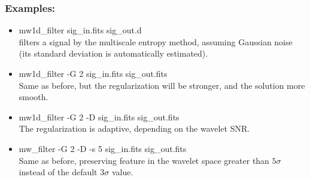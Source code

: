 \subsubsection*{Examples:}
\begin{itemize}
\baselineskip=0.4truecm
\itemsep=0.1truecm
\item mw1d\_filter sig\_in.fits sig\_out.d \\
filters a signal by the multiscale entropy method, assuming
Gaussian noise (its standard deviation is automatically estimated).
\item mw1d\_filter -G 2 sig\_in.fits sig\_out.fits \\
Same as before, but the regularization will be stronger, and the solution
more smooth.  
\item mw1d\_filter -G 2 -D sig\_in.fits sig\_out.fits \\
The regularization is adaptive, depending on the wavelet SNR.
\item mw\_filter -G 2 -D -s 5 sig\_in.fits sig\_out.fits \\ 
Same as before, preserving  feature in the wavelet space greater than
$5\sigma$ instead of the default $3\sigma$ value.
\end{itemize}


